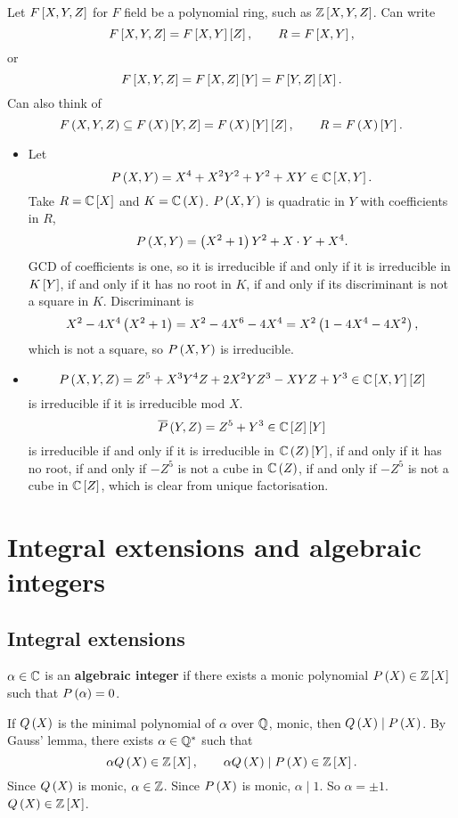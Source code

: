\begin{example*}
Let $ F\sb{X, Y, Z} $ for $ F $ field be a polynomial ring, such as $ \Z\sb{X, Y, Z} $. Can write
$$ F\sb{X, Y, Z} = F\sb{X, Y}\sb{Z}, \qquad R = F\sb{X, Y}, $$
or
$$ F\sb{X, Y, Z} = F\sb{X, Z}\sb{Y} = F\sb{Y, Z}\sb{X}. $$
Can also think of
$$ F\rb{X, Y, Z} \subseteq F\rb{X}\sb{Y, Z} = F\rb{X}\sb{Y}\sb{Z}, \qquad R = F\rb{X}\sb{Y}. $$
\begin{itemize}
\item Let
$$ P\rb{X, Y} = X^4 + X^2Y^2 + Y^2 + XY \in \C\sb{X, Y}. $$
Take $ R = \C\sb{X} $ and $ K = \C\rb{X} $. $ P\rb{X, Y} $ is quadratic in $ Y $ with coefficients in $ R $,
$$ P\rb{X, Y} = \rb{X^2 + 1}Y^2 + X \cdot Y + X^4. $$
GCD of coefficients is one, so it is irreducible if and only if it is irreducible in $ K\sb{Y} $, if and only if it has no root in $ K $, if and only if its discriminant is not a square in $ K $. Discriminant is
$$ X^2 - 4X^4\rb{X^2 + 1} = X^2 - 4X^6 - 4X^4 = X^2\rb{1 - 4X^4 - 4X^2}, $$
which is not a square, so $ P\rb{X, Y} $ is irreducible.
\item
$$ P\rb{X, Y, Z} = Z^5 + X^3Y^4Z + 2X^2YZ^3 - XYZ + Y^3 \in \C\sb{X, Y}\sb{Z} $$
is irreducible if it is irreducible mod $ X $.
$$ \overline{P}\rb{Y, Z} = Z^5 + Y^3 \in \C\sb{Z}\sb{Y} $$
is irreducible if and only if it is irreducible in $ \C\rb{Z}\sb{Y} $, if and only if it has no root, if and only if $ -Z^5 $ is not a cube in $ \C\rb{Z} $, if and only if $ -Z^5 $ is not a cube in $ \C\sb{Z} $, which is clear from unique factorisation.
\end{itemize}
\end{example*}

\pagebreak

\section{Integral extensions and algebraic integers}

\subsection{Integral extensions}

\begin{definition}
$ \alpha \in \C $ is an \textbf{algebraic integer} if there exists a monic polynomial $ P\rb{X} \in \Z\sb{X} $ such that $ P\rb{\alpha} = 0 $.
\end{definition}

\begin{note*}
If $ Q\rb{X} $ is the minimal polynomial of $ \alpha $ over $ \Q $, monic, then $ Q\rb{X} \mid P\rb{X} $. By Gauss' lemma, there exists $ \alpha \in \Q^* $ such that
$$ \alpha Q\rb{X} \in \Z\sb{X}, \qquad \alpha Q\rb{X} \mid P\rb{X} \in \Z\sb{X}. $$
Since $ Q\rb{X} $ is monic, $ \alpha \in \Z $. Since $ P\rb{X} $ is monic, $ \alpha \mid 1 $. So $ \alpha = \pm 1 $. $ Q\rb{X} \in \Z\sb{X} $.
\end{note*}

